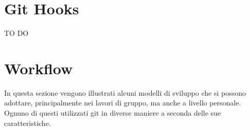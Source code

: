 
\newpage \clearpage
\section{Git Hooks} %
\label{sec:git_hooks}
TO DO






\newpage \clearpage
\section{Workflow} %
\label{sec:workflow}
In questa sezione vengono illustrati alcuni modelli di sviluppo che si possono adottare, principalmente nei lavori di gruppo, ma anche a livello personale. Ognuno di questi utilizzati git in diverse maniere a seconda delle sue caratteristiche.

